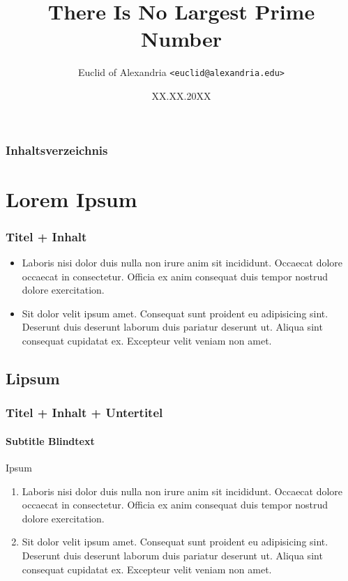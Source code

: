 \documentclass[aspectratio=169,t]{beamer}
\title{There Is No Largest Prime Number}
\date{XX.XX.20XX}
\author[Euclid]{Euclid of Alexandria {\small\texttt{<euclid@alexandria.edu>}}}
\begin{document}
\begin{frame}
  \titlepage
\end{frame}


\begin{frame}
  \frametitle{Inhaltsverzeichnis}
  \tableofcontents
\end{frame}


\section{Lorem Ipsum}
\begin{frame}
  \frametitle{Titel + Inhalt}
  \begin{itemize}
    \item Laboris nisi dolor duis nulla non irure anim sit incididunt.
      Occaecat dolore occaecat in consectetur.
      Officia ex anim consequat duis tempor nostrud dolore exercitation.
    \item Sit dolor velit ipsum amet.
      Consequat sunt proident eu adipisicing sint.
      Deserunt duis deserunt laborum duis pariatur deserunt ut.
      Aliqua sint consequat cupidatat ex. Excepteur velit veniam non amet.
  \end{itemize}
\end{frame}


\subsection{Lipsum}
\begin{frame}
  \frametitle{Titel + Inhalt + Untertitel}
  \framesubtitle{Subtitle Blindtext}
  Ipsum
  \begin{enumerate}
    \item Laboris nisi dolor duis nulla non irure anim sit incididunt.
      Occaecat dolore occaecat in consectetur.
      Officia ex anim consequat duis tempor nostrud dolore exercitation.
    \item Sit dolor velit ipsum amet.
      Consequat sunt proident eu adipisicing sint.
      Deserunt duis deserunt laborum duis pariatur deserunt ut.
      Aliqua sint consequat cupidatat ex. Excepteur velit veniam non amet.
  \end{enumerate}
\end{frame}
\end{document}

